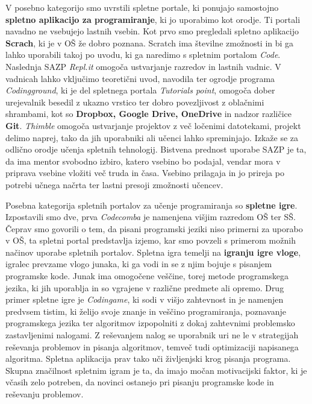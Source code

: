 V posebno kategorijo smo uvrstili spletne portale, ki ponujajo
samostojno \textbf{spletno aplikacijo za programiranje}, ki jo
uporabimo kot orodje. Ti portali navadno ne vsebujejo lastnih
vsebin. Kot prvo smo pregledali spletno aplikacijo \textbf{Scrach}, ki
je v OŠ že dobro poznana. Scratch ima številne zmožnosti in bi ga
lahko uporabili takoj po uvodu, ki ga naredimo s spletnim portalom
\emph{Code}. Naslednja SAZP \emph{Repl.it} omogoča ustvarjanje
razredov in lastnih vadnic. V vadnicah lahko vključimo teoretični
uvod, navodila ter ogrodje programa \emph{Codingground}, ki je del
spletnega portala \emph{Tutorials point}, omogoča dober urejevalnik
besedil z ukazno vrstico ter dobro povezljivost z oblačnimi shrambami,
kot so \textbf{Dropbox, Google Drive, OneDrive} in nadzor različice
\textbf{Git}. \emph{Thimble} omogoča ustvarjanje projektov z več
ločenimi datotekami, projekt delimo naprej, tako da jih uporabniki ali
učenci lahko spreminjajo. Izkaže se za odlično orodje učenja spletnih
tehnologij. Bistvena prednost uporabe SAZP je ta, da ima mentor
svobodno izbiro, katero vsebino bo podajal, vendar mora v priprava
vsebine vložiti več truda in časa. Vsebino prilagaja in jo prireja po
potrebi učnega načrta ter lastni presoji zmožnosti učencev.

Posebna kategorija spletnih portalov za učenje programiranja so
\textbf{spletne igre}. Izpostavili smo dve, prva \emph{Codecomba} je
namenjena višjim razredom OŠ ter SŠ. Čeprav smo govorili o tem, da
pisani programski jeziki niso primerni za uporabo v OŠ, ta spletni
portal predstavlja izjemo, kar smo povzeli s primerom možnih načinov
uporabe spletnih portalov. Spletna igra temelji na \textbf{igranju
  igre vloge}, igralec prevzame vlogo junaka, ki ga vodi in se z njim
bojuje s pisanjem programske kode. Junak ima omogočene veščine, torej
metode programskega jezika, ki jih uporablja in so vgrajene v različne
predmete ali opremo. Drug primer spletne igre je \emph{Codingame}, ki
sodi v višjo zahtevnost in je namenjen predvsem tistim, ki želijo
svoje znanje in veščino programiranja, poznavanje programskega jezika
ter algoritmov izpopolniti z dokaj zahtevnimi problemsko zastavljenimi
nalogami. Z reševanjem nalog se uporabnik uri ne le v strategijah
reševanja problemov in pisanja algoritmov, temveč tudi optimizaciji
napisanega algoritma. Spletna aplikacija prav tako uči življenjski
krog pisanja programa. Skupna značilnost spletnim igram je ta, da
imajo močan motivacijski faktor, ki je včasih zelo potreben, da
novinci ostanejo pri pisanju programske kode in reševanju
problemov.

